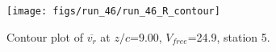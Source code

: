 \begin{figure}[H]
\centering
\texttt{[image: figs/run\_46/run\_46\_R\_contour]}
\caption{Contour plot of $\overline{v_{r}}$ at $z/c$=9.00, $V_{free}$=24.9, station 5.}
\label{fig:run_46_R_contour}
\end{figure}


